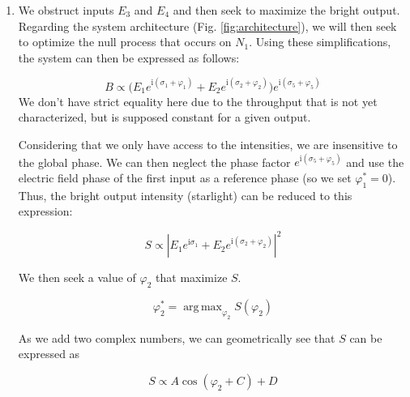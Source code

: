 \documentclass{aa}
\DeclareMathOperator*{\argmax}{arg\,max}
\newcommand{\mi}{\mathrm{i}}
\begin{document}
            \begin{enumerate}
                \item We obstruct inputs $E_3$ and $E_4$ and then seek to maximize the bright output. Regarding the system architecture (Fig. \ref{fig:architecture}), we will then seek to optimize the null process that occurs on $N_1$. Using these simplifications, the system can then be expressed as follows:
                    
                    \begin{equation}
                        B \propto \bigg(E_1e^{\mi(\sigma_1 + \varphi_1)} + E_2e^{\mi(\sigma_2 + \varphi_2)}\bigg)e^{\mi(\sigma_5 + \varphi_5)}
                    \end{equation}
                    We don't have strict equality here due to the throughput that is not yet characterized, but is supposed constant for a given output.
                    
                    Considering that we only have access to the intensities, we are insensitive to the global phase. We can then neglect the phase factor $e^{\mi(\sigma_5 + \varphi_5)}$ and use the electric field phase of the first input as a reference phase (so we set $\varphi_1^* = 0$). Thus, the bright output intensity (starlight) can be reduced to this expression:
                    
                    \begin{equation}
                        S \propto |E_1e^{\mi\sigma_1} + E_2e^{\mi(\sigma_2 + \varphi_2)}|^2
                    \end{equation}
                    
                    We then seek a value of $\varphi_2$ that maximize $S$.
                    
                    \begin{equation}
                        \varphi_2^* = \argmax_{\varphi_2} S(\varphi_2)
                    \end{equation}
                    
                    As we add two complex numbers, we can geometrically see that $S$ can be expressed as
                    
                    \begin{equation}
                        \label{sine_function}
                        S \propto A\cos(\varphi_2 + C) + D
                    \end{equation}
                    

\end{enumerate}
\end{document}
